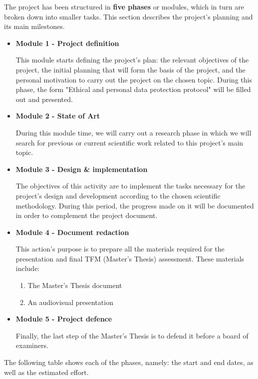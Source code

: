 The project has been structured in \textbf{five phases} or modules, which in turn are broken down into smaller tasks. This section describes the project's planning and its main milestones. 
\begin{itemize}
    \item \textbf{Module 1 - Project definition} 
    
    This module starts defining the project's plan: the relevant objectives of the project, the initial planning that will form the basis of the project, and the personal motivation to carry out the project on the chosen topic. During this phase, the form "Ethical and personal data protection protocol" will be filled out and presented.
    \item \textbf{Module 2 - State of Art}
    
    During this module time, we will carry out a research phase in which we will search for previous or current scientific work related to this project's main topic. 
    \item \textbf{Module 3 - Design \& implementation}
    
    The objectives of this activity are to implement the tasks necessary for the project's design and development according to the chosen scientific methodology. During this period, the progress made on it will be documented in order to complement the project document. 
    \item \textbf{Module 4 - Document redaction}
    
    This action's purpose is to prepare all the materials required for the presentation and final TFM (Master's Thesis) assessment. These materials include:
    
    \begin{enumerate}
        \item The Master's Thesis document
        \item An audiovisual presentation
    \end{enumerate}

    \item \textbf{Module 5 - Project defence}
    
    Finally, the last step of the Master's Thesis is to defend it before a board of examiners.
\end{itemize}

The following table shows each of the phases, namely: the start and end dates, as well as the estimated effort.


